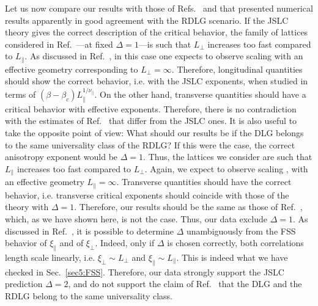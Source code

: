 \documentclass[12pt]{article}
\begin{document}
Let us now compare our results with those of Refs.~\cite{AGMM} and 
\cite{AS-02} that presented numerical results apparently in good 
agreement with the RDLG scenario. If the JSLC theory gives the correct 
description of the critical behavior, the family of lattices considered in 
Ref.~\cite{AGMM}---at fixed $\Delta=1$---is such that $L_\bot$ 
increases too fast compared to $L_\|$. As discussed in
Ref.~\cite{CGGP-shape}, in this case one expects to observe scaling 
with an effective geometry corresponding to $L_\bot = \infty$. Therefore,
longitudinal quantities should show the correct behavior, 
i.e. with the JSLC exponents, when studied in terms of 
$(\beta-\beta_c) L_\|^{1/\nu_\|}$. On the other hand,
transverse quantities should have 
a critical behavior with effective exponents.
Therefore, there is no contradiction with the estimates of Ref.~\cite{AGMM} 
that differ from the JSLC ones. 
It is also useful to take the opposite point of view: What should our results
be if the DLG belongs to the same universality class of the RDLG? If this 
were the case, the correct anisotropy exponent would be $\Delta = 1$. 
Thus, the lattices we consider are such that $L_\|$ increases too 
fast compared to $L_\bot$. Again, we expect to observe scaling 
\cite{CGGP-shape}, with an effective geometry $L_\| = \infty$. 
Transverse quantities should have the correct behavior, i.e. transverse 
critical exponents should coincide with those of the theory with $\Delta = 1$.
Therefore, our results should be the same as those of Ref.~\cite{AGMM}, which,
as we have shown here, is not the case. Thus, our data exclude 
$\Delta = 1$. As discussed in Ref.~\cite{CGGP-shape}, it is possible to 
determine $\Delta$ unambiguously from the FSS behavior of $\xi_\|$ and 
of $\xi_\bot$. Indeed, only if $\Delta$ is chosen correctly, both 
correlations length scale linearly, i.e. $\xi_\bot \sim L_\bot$ and 
$\xi_\|\sim L_\|$. This is indeed what we have checked in Sec.~\ref{sec5:FSS}.
Therefore, our data strongly support the JSLC prediction $\Delta = 2$, 
and do not support the claim of Ref.~\cite{AGMM} that the DLG and the 
RDLG belong to the same universality class.
\end{document}
